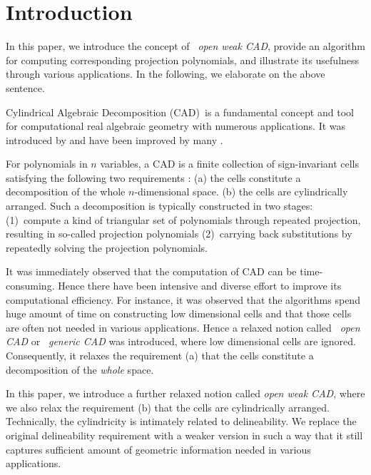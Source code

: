 \documentclass[amsthm]{elsart}
\begin{document}
\section{Introduction}
\label{secc:intro}
In this paper, we introduce the concept of {\em\ open weak CAD}, provide an algorithm for computing corresponding projection polynomials, and illustrate its usefulness through various applications. In the following, we elaborate on the above sentence.

Cylindrical Algebraic Decomposition (CAD)\ is a fundamental concept and tool for computational real algebraic geometry with numerous applications. It was introduced by
\citet{collins1,Caviness1998} and have been improved
by  many \citep{McCallum, Hong:90a, Collins_Hong:91, Hong:92a, LS93, Ren, BPR96,  McCallumeq, AnaiW01, Brown01a, Strzebonski06, Hong_Safey2012,Chen_Maza2014}.


For polynomials in $n$ variables, a CAD is a finite collection of sign-invariant cells satisfying the following two requirements : (a) the cells constitute a  decomposition  of the whole $n$-dimensional space.  (b) the cells  are cylindrically arranged.  Such a decomposition is typically constructed in two stages: (1)\  compute   a kind of triangular set of  polynomials through repeated projection, resulting  in so-called projection polynomials (2)\ carrying back substitutions by repeatedly solving the projection polynomials.

It  was immediately observed that the computation   of CAD can be     time-consuming. Hence there have been intensive and diverse effort to improve its computational efficiency.  For instance, it was observed that the algorithms spend  huge amount of time on  constructing low dimensional cells and that those cells are often not needed in various applications. Hence a relaxed notion called {\em\ open CAD} or {\em\ generic CAD} was introduced, where  low dimensional cells are ignored. Consequently, it relaxes the requirement (a) that the cells constitute a decomposition of the {\em whole\/} space.

In this paper, we introduce a further relaxed notion called {\em open weak CAD}, where we  also relax  the requirement (b)  that the cells  are cylindrically arranged.   Technically, the cylindricity is intimately related to  delineability.   We replace the original delineability requirement with a weaker version in such a way that it still captures sufficient amount of geometric information needed in various applications.
\end{document}
